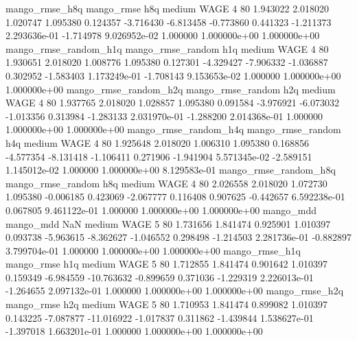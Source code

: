        mango_rmse_h8q        mango_rmse                  h8q     medium     WAGE                 4 80  1.943022       2.018020 1.020747       1.095380    0.124357     -3.716430     -6.813458    -0.773860       0.441323 -1.211373 2.293636e-01    -1.714978   9.026952e-02            1.000000    1.000000e+00        1.000000e+00
mango_rmse_random_h1q mango_rmse_random                  h1q     medium     WAGE                 4 80  1.930651       2.018020 1.008776       1.095380    0.127301     -4.329427     -7.906332    -1.036887       0.302952 -1.583403 1.173249e-01    -1.708143   9.153653e-02            1.000000    1.000000e+00        1.000000e+00
mango_rmse_random_h2q mango_rmse_random                  h2q     medium     WAGE                 4 80  1.937765       2.018020 1.028857       1.095380    0.091584     -3.976921     -6.073032    -1.013356       0.313984 -1.283133 2.031970e-01    -1.288200   2.014368e-01            1.000000    1.000000e+00        1.000000e+00
mango_rmse_random_h4q mango_rmse_random                  h4q     medium     WAGE                 4 80  1.925648       2.018020 1.006310       1.095380    0.168856     -4.577354     -8.131418    -1.106411       0.271906 -1.941904 5.571345e-02    -2.589151   1.145012e-02            1.000000    1.000000e+00        8.129583e-01
mango_rmse_random_h8q mango_rmse_random                  h8q     medium     WAGE                 4 80  2.026558       2.018020 1.072730       1.095380   -0.006185      0.423069     -2.067777     0.116408       0.907625 -0.442657 6.592238e-01     0.067805   9.461122e-01            1.000000    1.000000e+00        1.000000e+00
            mango_mdd         mango_mdd                  NaN     medium     WAGE                 5 80  1.731656       1.841474 0.925901       1.010397    0.093738     -5.963615     -8.362627    -1.046552       0.298498 -1.214503 2.281736e-01    -0.882897   3.799704e-01            1.000000    1.000000e+00        1.000000e+00
       mango_rmse_h1q        mango_rmse                  h1q     medium     WAGE                 5 80  1.712855       1.841474 0.901642       1.010397    0.159349     -6.984559    -10.763632    -0.899659       0.371036 -1.229319 2.226013e-01    -1.264655   2.097132e-01            1.000000    1.000000e+00        1.000000e+00
       mango_rmse_h2q        mango_rmse                  h2q     medium     WAGE                 5 80  1.710953       1.841474 0.899082       1.010397    0.143225     -7.087877    -11.016922    -1.017837       0.311862 -1.439844 1.538627e-01    -1.397018   1.663201e-01            1.000000    1.000000e+00        1.000000e+00
